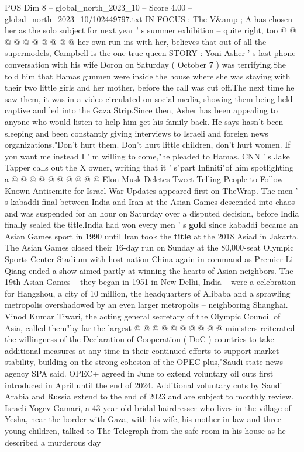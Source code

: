 \begin{textsample}{POS Dim 8 – global\_north\_2023\_10 – Score 4.00 – global\_north\_2023\_10/102449797.txt}
IN FOCUS : The V\&amp ; A has chosen her as the solo subject for next year ' s summer exhibition -- quite right, too @ @ @ @ @ @ @ @ @ @ her own run-ins with her, believes that out of all the supermodels, Campbell is the one true queen STORY : Yoni Asher ' s last phone conversation with his wife Doron on Saturday ( October 7 ) was terrifying.She told him that Hamas gunmen were inside the house where she was staying with their two little girls and her mother, before the call was cut off.The next time he saw them, it was in a video circulated on social media, showing them being held captive and led into the Gaza Strip.Since then, Asher has been appealing to anyone who would listen to help him get his family back.
He says hasn't been sleeping and been constantly giving interviews to Israeli and foreign news organizations."Don't hurt them.
Don't hurt little children, don't hurt women.
If you want me instead I ' m willing to come,"he pleaded to Hamas.
CNN ' s Jake Tapper calls out the X owner, writing that it ' s"part Infiniti"of him spotlighting a @ @ @ @ @ @ @ @ @ @ Elon Musk Deletes Tweet Telling People to Follow Known Antisemite for Israel War Updates appeared first on TheWrap.
The men ' s kabaddi final between India and Iran at the Asian Games descended into chaos and was suspended for an hour on Saturday over a disputed decision, before India finally sealed the title.India had won every men ' s \textbf{gold} since kabaddi became an Asian Games sport in 1990 until Iran took the \textbf{title} at the 2018 Asiad in Jakarta.
The Asian Games closed their 16-day run on Sunday at the 80,000-seat Olympic Sports Center Stadium with host nation China again in command as Premier Li Qiang ended a show aimed partly at winning the hearts of Asian neighbors.
The 19th Asian Games -- they began in 1951 in New Delhi, India -- were a celebration for Hangzhou, a city of 10 million, the headquarters of Alibaba and a sprawling metropolis overshadowed by an even larger metropolis -- neighboring Shanghai.
Vinod Kumar Tiwari, the acting general secretary of the Olympic Council of Asia, called them"by far the largest @ @ @ @ @ @ @ @ @ @ ministers reiterated the willingness of the Declaration of Cooperation ( DoC ) countries to take additional measures at any time in their continued efforts to support market stability, building on the strong cohesion of the OPEC plus,"Saudi state news agency SPA said.
OPEC+ agreed in June to extend voluntary oil cuts first introduced in April until the end of 2024.
Additional voluntary cuts by Saudi Arabia and Russia extend to the end of 2023 and are subject to monthly review.
Israeli Yogev Gamari, a 43-year-old bridal hairdresser who lives in the village of Yesha, near the border with Gaza, with his wife, his mother-in-law and three young children, talked to The Telegraph from the safe room in his house as he described a murderous day

\end{textsample}
